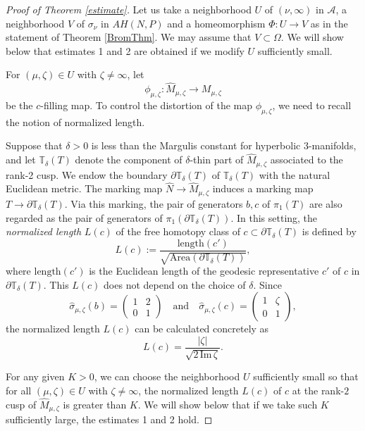 \documentclass[12pt]{article}
\theoremstyle{plain}
\theoremstyle{definition}
\theoremstyle{remark}
\newcommand{\A}{\mathcal A}
\newcommand{\fty}{\infty}
\newcommand{\bd}{\partial}
\newcommand{\ze}{\zeta}
\newcommand{\im}{\mathrm{Im}}
\begin{document}
\begin{proof} [Proof of Theorem \ref{estimate}] 
Let us take a neighborhood $U$ of  $(\nu,\fty)$ in $\A$, 
a neighborhood $V$ of $\sigma_{\nu}$ in $AH(N,P)$ 
and a homeomorphism $\Phi:U \to V$ as in the statement of Theorem \ref{BromThm}. 
We may assume that $V \subset \Omega$. 
We will show below that estimates 1 and 2 are obtained 
 if we modify $U$ sufficiently small. 
 
For $(\mu,\ze) \in U$ with $\ze \ne \fty$, 
let 
$$
\phi_{\mu,\ze}:\hat M_{\mu,\ze} \to M_{\mu,\ze}
$$ 
be the $c$-filling map.   
To control the distortion of the map $\phi_{\mu,\ze}$, we need to recall the notion of normalized length. 

Suppose that  $\delta>0$ is less than the Margulis constant for hyperbolic 3-manifolds, and let 
$\mathbb{T}_\delta(T)$ denote the component of $\delta$-thin part of $\hat M_{\mu,\ze}$ 
associated to the rank-2 cusp.  
We endow the boundary $\bd \mathbb{T}_\delta(T)$  of $\mathbb{T}_\delta(T)$ 
with the natural  Euclidean metric. 
The marking map $\hat N \to \hat M_{\mu,\ze}$ 
induces a marking map $T \to \bd \mathbb{T}_\delta(T)$. 
Via this marking, the pair of generators $b,c $ of $\pi_1(T)$ are also regarded as the pair of generators of 
 $\pi_1(\bd \mathbb{T}_\delta(T))$. 
In this setting, the {\it normalized length} $L(c)$ 
of the free homotopy class of $c \subset \bd \mathbb{T}_\delta (T)$  
is defined by 
$$
L(c):=\frac{\mathrm{length}(c')}
{\sqrt{\mathrm{Area}(\bd \mathbb{T}_\delta(T))}}, 
$$
where $\mathrm{length}(c')$ is the Euclidean length of the geodesic representative $c'$ of $c$ in 
$\bd \mathbb{T}_\delta (T)$. 
This $L(c)$ does not depend on the choice of $\delta$. 
Since 
$$
\hat \sigma_{\mu,\ze}(b)=
\left(\begin{array}{cc}
 1 & 2 \\ 
 0& 1
 \end{array}\right) 
 \quad \text{and} \quad 
 \hat \sigma_{\mu,\ze}(c)=\left(\begin{array}{cc}
 1 & \ze \\ 
 0& 1
 \end{array}\right), 
$$
the normalized length $L(c)$ can be calculated concretely as 
$$
L(c)=\frac{|\zeta|}{\sqrt{2 \, \im \,\zeta}}. 
$$

 For any given $K>0$, we can choose the neighborhood $U$ sufficiently small 
 so that  for all $(\mu,\ze) \in U$ with $\ze \ne \fty$,  
 the normalized length $L(c)$ of $c$ at the rank-$2$ cusp of $\hat M_{\mu,\ze}$ is greater than $K$. 
We will show below that if we take such $K$ sufficiently large, the estimates 1 and 2 hold.  
 


\end{proof}
\end{document}
